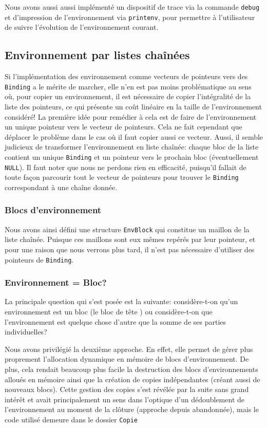 \documentclass[a4paper,11pt]{article}
\begin{document}
Nous avons aussi aussi implémenté un dispositif de trace via la commande 
\texttt{debug} et d'impression de l'environnement via \texttt{printenv}, 
pour permettre à l'utilisateur de suivre l'évolution de l'environnement courant.

\subsection{Environnement par listes chaînées}

Si l’implémentation des environnement comme vecteurs 
de pointeurs vers des \texttt{Binding} a le mérite de marcher, elle n'en est
pas moins problématique au sens où, pour copier un environnement, il est
nécessaire de copier l'intégralité de la liste des pointeurs, ce qui présente un
coût linéaire en la taille de l'environnement considéré!
La première idée pour remédier à cela est de faire de l'environnement un unique
pointeur vers le vecteur de pointeurs. Cela ne fait cependant que déplacer le
problème dans le cas où il faut copier aussi ce vecteur.
Aussi, il semble judicieux de transformer l’environnement en liste chaînée:
chaque bloc de la liste contient un unique \texttt{Binding} et un pointeur vers
le prochain bloc (éventuellement \texttt{NULL}). Il faut noter que nous ne perdons rien
en efficacité, puisqu'il fallait de toute façon parcourir tout le vecteur de
pointeurs pour trouver le \texttt{Binding} correspondant à une chaîne donnée.

\subsubsection{Blocs d’environnement}

Nous avons ainsi défini une structure \texttt{EnvBlock} qui constitue un maillon
de la liste chaînée. Puisque ces maillons sont eux mêmes repérés par leur
pointeur, et pour une raison que nous verrons plus tard, il n'est pas nécessaire
d'utiliser des pointeurs de \texttt{Binding}.

\subsubsection{Environnement = Bloc?}

La principale question qui s'est posée est la suivante: considère-t-on qu'un
environnement est un bloc (le bloc de \og tête \fg) ou considère-t-on que
l'environnement est quelque chose d'autre que la somme de ses
parties individuelles?

Nous avons privilégié la deuxième approche. En effet, elle permet de gérer plus
proprement l'allocation dynamique en mémoire de blocs d'environnement. De plus,
cela rendait beaucoup plus facile la destruction des blocs d'environnements
alloués en mémoire ainsi que la création de copies indépendantes (créant aussi
de nouveaux blocs). Cette gestion des copies s'est révélée par la suite sans
grand intérêt et avait principalement un sens dans l'optique d'un dédoublement
de l'environnement au moment de la clôture (approche depuis abandonnée), mais le
code utilisé demeure dans le dossier \texttt{Copie}
\end{document}
